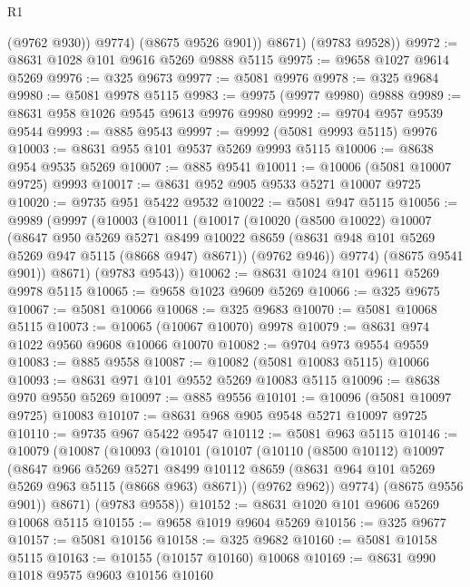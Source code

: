 \begin{lexlean}{R1}
\begin{coremodule}
              (@9762 @930))
            @9774)
          (@8675 @9526 @901))
        @8671)
      (@9783 @9528))
@9972 := @8631 @1028 @101 @9616 @5269 @9888 @5115
@9975 := @9658 @1027 @9614 @5269
@9976 := @325 @9673
@9977 := @5081 @9976
@9978 := @325 @9684
@9980 := @5081 @9978 @5115
@9983 := @9975 (@9977 @9980) @9888
@9989 := @8631 @958 @1026 @9545 @9613 @9976 @9980
@9992 := @9704 @957 @9539 @9544
@9993 := @885 @9543
@9997 := @9992 (@5081 @9993 @5115) @9976
@10003 := @8631 @955 @101 @9537 @5269 @9993 @5115
@10006 := @8638 @954 @9535 @5269
@10007 := @885 @9541
@10011 := @10006 (@5081 @10007 @9725) @9993
@10017 := @8631 @952 @905 @9533 @5271 @10007 @9725
@10020 := @9735 @951 @5422 @9532
@10022 := @5081 @947 @5115
@10056 := @9989
    (@9997
      (@10003
        (@10011
          (@10017
            (@10020
              (@8500 @10022)
              @10007
              (@8647
                @950
                @5269
                @5271
                @8499
                @10022
                @8659
                (@8631 @948 @101 @5269 @5269 @947 @5115 (@8668 @947) @8671))
              (@9762 @946))
            @9774)
          (@8675 @9541 @901))
        @8671)
      (@9783 @9543))
@10062 := @8631 @1024 @101 @9611 @5269 @9978 @5115
@10065 := @9658 @1023 @9609 @5269
@10066 := @325 @9675
@10067 := @5081 @10066
@10068 := @325 @9683
@10070 := @5081 @10068 @5115
@10073 := @10065 (@10067 @10070) @9978
@10079 := @8631 @974 @1022 @9560 @9608 @10066 @10070
@10082 := @9704 @973 @9554 @9559
@10083 := @885 @9558
@10087 := @10082 (@5081 @10083 @5115) @10066
@10093 := @8631 @971 @101 @9552 @5269 @10083 @5115
@10096 := @8638 @970 @9550 @5269
@10097 := @885 @9556
@10101 := @10096 (@5081 @10097 @9725) @10083
@10107 := @8631 @968 @905 @9548 @5271 @10097 @9725
@10110 := @9735 @967 @5422 @9547
@10112 := @5081 @963 @5115
@10146 := @10079
    (@10087
      (@10093
        (@10101
          (@10107
            (@10110
              (@8500 @10112)
              @10097
              (@8647
                @966
                @5269
                @5271
                @8499
                @10112
                @8659
                (@8631 @964 @101 @5269 @5269 @963 @5115 (@8668 @963) @8671))
              (@9762 @962))
            @9774)
          (@8675 @9556 @901))
        @8671)
      (@9783 @9558))
@10152 := @8631 @1020 @101 @9606 @5269 @10068 @5115
@10155 := @9658 @1019 @9604 @5269
@10156 := @325 @9677
@10157 := @5081 @10156
@10158 := @325 @9682
@10160 := @5081 @10158 @5115
@10163 := @10155 (@10157 @10160) @10068
@10169 := @8631 @990 @1018 @9575 @9603 @10156 @10160

\end{coremodule}
\end{lexlean}
